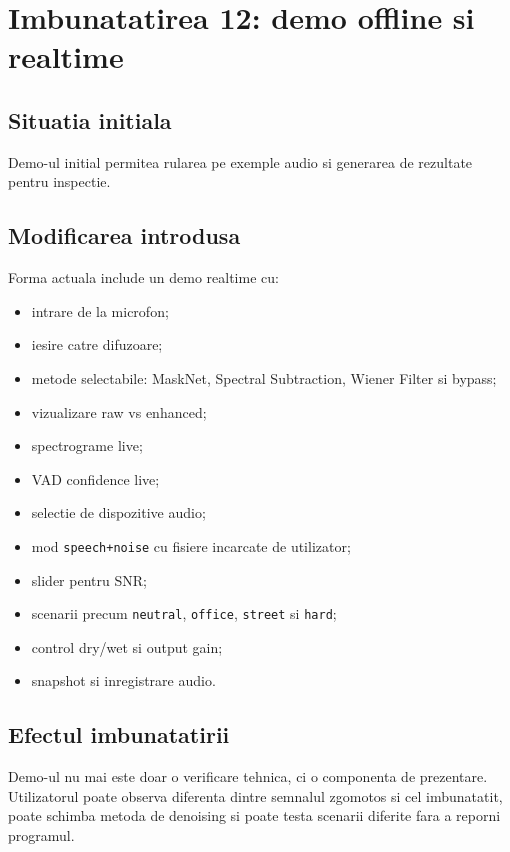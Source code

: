 \documentclass[12pt,a4paper]{article}
\begin{document}
\section{Imbunatatirea 12: demo offline si realtime}

\subsection{Situatia initiala}

Demo-ul initial permitea rularea pe exemple audio si generarea de rezultate pentru
inspectie.

\subsection{Modificarea introdusa}

Forma actuala include un demo realtime cu:

\begin{itemize}
    \item intrare de la microfon;
    \item iesire catre difuzoare;
    \item metode selectabile: MaskNet, Spectral Subtraction, Wiener Filter si
    bypass;
    \item vizualizare raw vs enhanced;
    \item spectrograme live;
    \item VAD confidence live;
    \item selectie de dispozitive audio;
    \item mod \texttt{speech+noise} cu fisiere incarcate de utilizator;
    \item slider pentru SNR;
    \item scenarii precum \texttt{neutral}, \texttt{office}, \texttt{street} si
    \texttt{hard};
    \item control dry/wet si output gain;
    \item snapshot si inregistrare audio.
\end{itemize}

\subsection{Efectul imbunatatirii}

Demo-ul nu mai este doar o verificare tehnica, ci o componenta de prezentare.
Utilizatorul poate observa diferenta dintre semnalul zgomotos si cel imbunatatit,
poate schimba metoda de denoising si poate testa scenarii diferite fara a reporni
programul.
\end{document}
